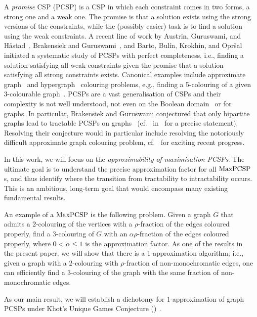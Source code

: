 \documentclass[a4paper,11pt, DIV=11]{scrartcl}
\DeclareMathOperator{\maxPCSP}{\textup{MaxPCSP}}
\theoremstyle{plain}
\theoremstyle{definition}
\begin{document}
A \emph{promise} CSP (PCSP) is a CSP in which each
constraint comes in two forms, a strong one and a weak one. The promise is that
a solution exists using the strong versions of the constraints, while the
(possibly easier) task is to find a solution using the weak constraints. A
recent line of work by Austrin, Guruswami, and H{\aa}stad~\cite{AGH17},
Brakensiek and Guruswami~\cite{BG21:sicomp}, and Barto, Bul\'in, Krokhin, and
Opr\v{s}al~\cite{BBKO21} initiated a systematic study of PCSPs with perfect completeness,
i.e., finding a solution satisfying all weak constraints given the promise that
a solution satisfying all strong constraints exists. Canonical examples include 
approximate graph~\cite{GJ76} and hypergraph~\cite{DRS05,ABP20,Barto21:stacs} colouring problems,
e.g., finding a 5-colouring of a given 3-colourable graph~\cite{KOWZ23}.
PCSPs are a vast generalisation of CSPs and their complexity is not well
understood, not even on the Boolean domain~\cite{Ficak19:icalp,BGS23} or for
graphs. In particular, Brakensiek and Guruswami conjectured that only bipartite
graphs lead to tractable PCSPs on graphs~\cite{BG21:sicomp} (cf.~
in~ for a precise statement). Resolving their 
conjecture would in particular include resolving the notoriously difficult approximate graph
colouring problem, cf.~\cite{Avvakumo25:stoc} for exciting recent progress.

\medskip

In this work, we will focus on the \emph{approximability of maximisation PCSPs}. The ultimate goal is to understand the precise
approximation factor for all $\maxPCSP$s, and thus identify where the transition
from tractability to intractability occurs. This is an ambitious, long-term goal
that would encompass many existing fundamental results.

An example of a $\maxPCSP$ is the following problem. Given a graph $G$ that
admits a $2$-colouring of the vertices with a $\rho$-fraction of the edges
coloured properly, find a $3$-colouring of $G$ with an $\alpha\rho$-fraction of
the edges coloured properly, where $0<\alpha\leq 1$ is the approximation factor.
As one of the results in the present paper, we will show that there is a
1-approximation algorithm; i.e., given a graph with a 2-colouring with
$\rho$-fraction of non-monochromatic edges, one can efficiently find a
3-colouring of the graph with the same fraction of non-monochromatic edges. 

As our main result, we will establish a dichotomy for 1-approximation of graph
PCSPs under Khot's Unique Games Conjecture (\UGC)~\cite{Khot02stoc}.
\end{document}
